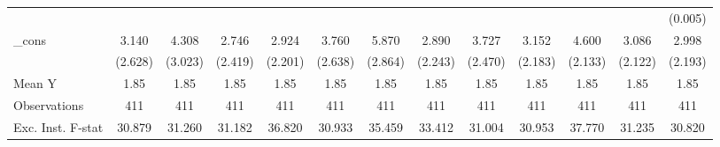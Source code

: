 {\begin{tabular}{l*{12}{c}}
            &                     &                     &                     &                     &                     &                     &                     &                     &                     &                     &                     &     (0.005)         \\
\addlinespace
\_cons      &       3.140         &       4.308         &       2.746         &       2.924         &       3.760         &       5.870\sym{*}  &       2.890         &       3.727         &       3.152         &       4.600\sym{**} &       3.086         &       2.998         \\
            &     (2.628)         &     (3.023)         &     (2.419)         &     (2.201)         &     (2.638)         &     (2.864)         &     (2.243)         &     (2.470)         &     (2.183)         &     (2.133)         &     (2.122)         &     (2.193)         \\
\midrule
Mean Y      &        1.85         &        1.85         &        1.85         &        1.85         &        1.85         &        1.85         &        1.85         &        1.85         &        1.85         &        1.85         &        1.85         &        1.85         \\
Observations&         411         &         411         &         411         &         411         &         411         &         411         &         411         &         411         &         411         &         411         &         411         &         411         \\
Exc. Inst. F-stat&      30.879         &      31.260         &      31.182         &      36.820         &      30.933         &      35.459         &      33.412         &      31.004         &      30.953         &      37.770         &      31.235         &      30.820         \\
\bottomrule
\end{tabular}
}
